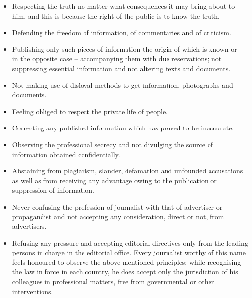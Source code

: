 \begin{itemize}
	\item Respecting the truth no matter what consequences it may bring about to him, and this is because the right of the public is to know the truth.

	\item Defending the freedom of information, of commentaries and of criticism.

	\item Publishing only such pieces of information the origin of which is known or – in the opposite case – accompanying them with due reservations; not suppressing essential information and not altering texts and documents.

	\item Not making use of disloyal methods to get information, photographs and documents.

	\item Feeling obliged to respect the private life of people.

	\item Correcting any published information which has proved to be inaccurate.

	\item Observing the professional secrecy and not divulging the source of information obtained confidentially.

	\item Abstaining from plagiarism, slander, defamation and unfounded accusations as well as from receiving any advantage owing to the publication or suppression of information.

	\item Never confusing the profession of journalist with that of advertiser or propagandist and not accepting any consideration, direct or not, from advertisers.

	\item Refusing any pressure and accepting editorial directives only from the leading persons in charge in the editorial office. Every journalist worthy of this name feels honoured to observe the above-mentioned principles; while recognising the law in force in each country, he does accept only the jurisdiction of his colleagues in professional matters, free from governmental or other interventions.
\end{itemize}

	\pagebreak
